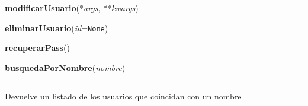 \hspace{.8\funcindent}\begin{boxedminipage}{\funcwidth}

    \raggedright \textbf{modificarUsuario}(*\textit{args}, **\textit{kwargs})

\setlength{\parskip}{2ex}
\setlength{\parskip}{1ex}
    \end{boxedminipage}

    \label{app:vista:vistaUsuario:eliminarUsuario}

    \vspace{0.5ex}

\hspace{.8\funcindent}\begin{boxedminipage}{\funcwidth}

    \raggedright \textbf{eliminarUsuario}(\textit{id}={\tt None})

\setlength{\parskip}{2ex}
\setlength{\parskip}{1ex}
    \end{boxedminipage}

    \label{app:vista:vistaUsuario:recuperarPass}

    \vspace{0.5ex}

\hspace{.8\funcindent}\begin{boxedminipage}{\funcwidth}

    \raggedright \textbf{recuperarPass}()

\setlength{\parskip}{2ex}
\setlength{\parskip}{1ex}
    \end{boxedminipage}

    \label{app:vista:vistaUsuario:busquedaPorNombre}

    \vspace{0.5ex}

\hspace{.8\funcindent}\begin{boxedminipage}{\funcwidth}

    \raggedright \textbf{busquedaPorNombre}(\textit{nombre})

    \vspace{-1.5ex}

    \rule{\textwidth}{0.5\fboxrule}
\setlength{\parskip}{2ex}
    Devuelve un listado de los usuarios que coincidan con un nombre

\setlength{\parskip}{1ex}
    \end{boxedminipage}

